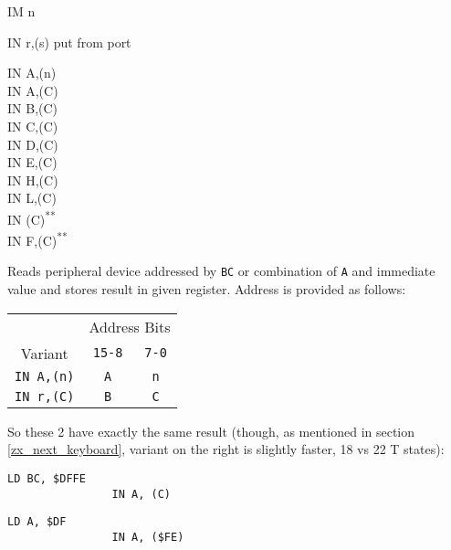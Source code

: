 \documentclass[12pt,twoside,openright,a4paper]{book}
\newcommand{\UNDOC}{\textnormal{\textsuperscript{**}}}
\begin{document}
\begin{basedescript}{
	\desclabelstyle{\multilinelabel}
	\desclabelwidth{3cm}}
\begin{DetailItem}{IM n}
	\end{DetailItem}

	\pagebreak
	\begin{DetailItem}{IN r,(s)}
		{put from port}
		{}

		\begin{DetailVariants}
			IN A,(n)\\
			IN A,(C)\\
			IN B,(C)\\
			IN C,(C)\\
			IN D,(C)\\
			IN E,(C)\\
			IN H,(C)\\
			IN L,(C)\\
			IN (C)\UNDOC\\
			IN F,(C)\UNDOC
		\end{DetailVariants}

		Reads peripheral device addressed by {\tt BC} or combination of {\tt A} and immediate value and stores result in given register. Address is provided as follows:

		\begin{tabular}{ccc}
			& \multicolumn{2}{c}{Address Bits} \\
			Variant & {\tt 15-8} & {\tt 7-0} \\
			\hline
			{\tt IN A,(n)} & {\tt A} & {\tt n} \\
			{\tt IN r,(C)} & {\tt B} & {\tt C} \\
		\end{tabular}
		\vspace{1ex} %

		So these 2 have exactly the same result (though, as mentioned in section \ref{zx_next_keyboard}, variant on the right is slightly faster, 18 vs 22 T states):

		\begin{multicols}{2}
			\begin{Verbatim}[gobble=4]
				LD BC, $DFFE
				IN A, (C)
			\end{Verbatim}
			\columnbreak
			\begin{Verbatim}[gobble=4]
				LD A, $DF
				IN A, ($FE)
			\end{Verbatim}
		\end{multicols}

		\begin{DetailEffects}[p]
			\FlagsINrc[\tt IN r,(C)]
			\FlagsINan[{\tt IN A,(n)} (no effect)]
		\end{DetailEffects}
						

\end{DetailItem}
\end{basedescript}
\end{document}
